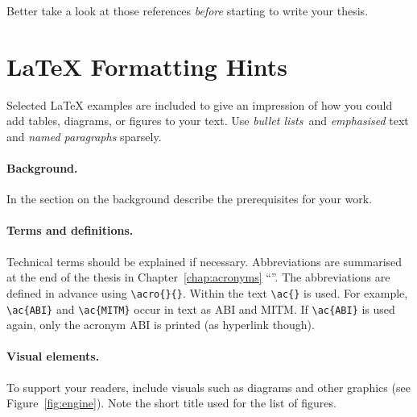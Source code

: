 Better take a look at those references \emph{before} starting to write
your thesis.


\section{\LaTeX{} Formatting Hints}

Selected \LaTeX{} examples are included to give an impression of how you could add tables, diagrams, or figures to your text. Use \emph{bullet lists} and \emph{emphasised} text and \emph{named paragraphs} sparsely.

\paragraph{Background.} In the section on the background describe
the prerequisites for your work.

\paragraph{Terms and definitions.}
Technical terms should be explained if necessary. Abbreviations are
summarised at the end of the thesis in Chapter~\ref{chap:acronyms}
``''. The abbreviations are defined in advance
using \verb+\acro{}{}+. Within the text \verb+\ac{}+ is used. For
example, \verb+\ac{ABI}+ and \verb+\ac{MITM}+ occur in text
as \ac{ABI} and \ac{MITM}. If \verb+\ac{ABI}+ is used again, only
the acronym \ac{ABI} is printed (as hyperlink though).

\paragraph{Visual elements.}
To support your readers, include visuals such as diagrams and other graphics
(see Figure~\ref{fig:engine}). Note the short title used for the list of
figures.




